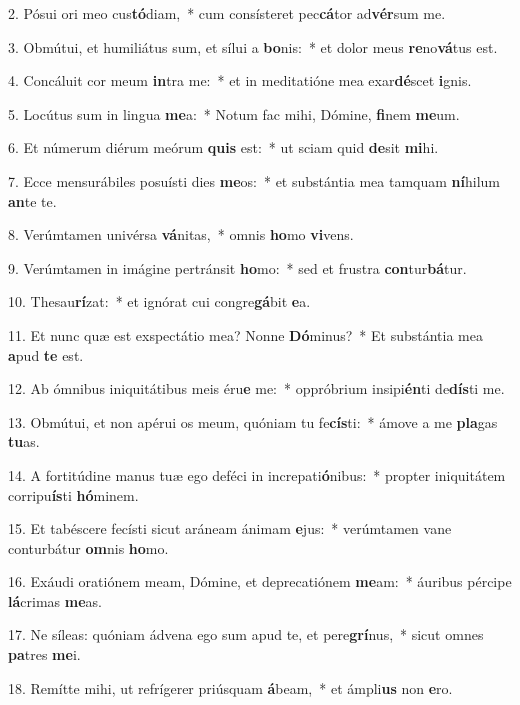 2. Pósui ori meo cus\textbf{tó}diam,~*  cum consísteret pec\textbf{cá}tor ad\textbf{vér}sum me.\

3. Obmútui, et humiliátus sum, et sílui a \textbf{bo}nis:~*  et dolor meus \textbf{re}no\textbf{vá}tus est.\

4. Concáluit cor meum \textbf{in}tra me:~*  et in meditatióne mea exar\textbf{dé}scet \textbf{i}gnis.\

5. Locútus sum in lingua \textbf{me}a:~*  Notum fac mihi, Dómine, \textbf{fi}nem \textbf{me}um.\

6. Et númerum diérum meórum \textbf{quis} est:~*  ut sciam quid \textbf{de}sit \textbf{mi}hi.\

7. Ecce mensurábiles posuísti dies \textbf{me}os:~*  et substántia mea tamquam \textbf{ní}hilum \textbf{an}te te.\

8. Verúmtamen univérsa \textbf{vá}nitas,~*  omnis \textbf{ho}mo \textbf{vi}vens.\

9. Verúmtamen in imágine pertránsit \textbf{ho}mo:~*  sed et frustra \textbf{con}tur\textbf{bá}tur.\

10. Thesau\textbf{rí}zat:~*  et ignórat cui congre\textbf{gá}bit \textbf{e}a.\

11. Et nunc quæ est exspectátio mea? Nonne \textbf{Dó}minus?~*  Et substántia mea \textbf{a}pud \textbf{te} est.\

12. Ab ómnibus iniquitátibus meis éru\textbf{e} me:~*  oppróbrium insipi\textbf{én}ti de\textbf{dís}ti me.\

13. Obmútui, et non apérui os meum, quóniam tu fe\textbf{cís}ti:~*  ámove a me \textbf{pla}gas \textbf{tu}as.\

14. A fortitúdine manus tuæ ego deféci in increpati\textbf{ó}nibus:~*  propter iniquitátem corripu\textbf{ís}ti \textbf{hó}minem.\

15. Et tabéscere fecísti sicut aráneam ánimam \textbf{e}jus:~*  verúmtamen vane conturbátur \textbf{om}nis \textbf{ho}mo.\

16. Exáudi oratiónem meam, Dómine, et deprecatiónem \textbf{me}am:~*  áuribus pércipe \textbf{lá}crimas \textbf{me}as.\

17. Ne síleas: quóniam ádvena ego sum apud te, et pere\textbf{grí}nus,~*  sicut omnes \textbf{pa}tres \textbf{me}i.\

18. Remítte mihi, ut refrígerer priúsquam \textbf{á}beam,~*  et ámpli\textbf{us} non \textbf{e}ro.\

